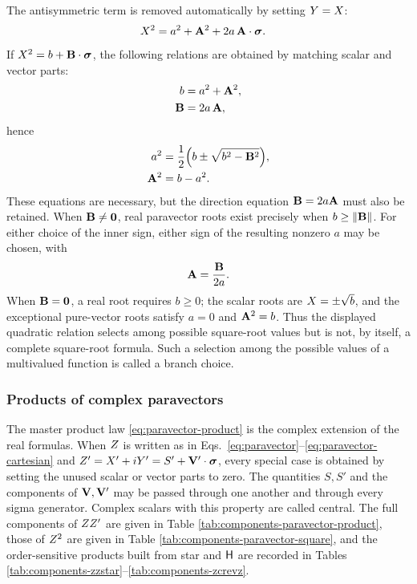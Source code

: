 The antisymmetric term is removed automatically by setting
\(Y=X\):
\begin{align*}
X^2
&= a^2+\mathbf{A}^2+2a\,\mathbf{A}\cdot\mathbf{\bm{\sigma}}.
\end{align*}
If \(X^2=b+\mathbf{B}\cdot\mathbf{\bm{\sigma}}\), the following relations are obtained by
matching scalar and vector parts:
\begin{align*}
b &= a^2+\mathbf{A}^2,\\
\mathbf{B} &= 2a\,\mathbf{A},
\end{align*}
hence
\begin{align*}
a^2 &= \frac{1}{2}\Bigl(b\pm\sqrt{b^2-\mathbf{B}^2}\Bigr),\\
\mathbf{A}^2 &= b-a^2.
\end{align*}
These equations are necessary, but the direction equation
\(\mathbf{B}=2a\mathbf{A}\) must also be retained. When
\(\mathbf{B}\neq\mathbf{0}\), real paravector roots exist precisely when
\(b\geq\lVert\mathbf{B}\rVert\). For either choice of the inner sign, either
sign of the resulting nonzero \(a\) may be chosen, with
\begin{equation*}
\mathbf{A}=\frac{\mathbf{B}}{2a}.
\end{equation*}
When \(\mathbf{B}=\mathbf{0}\), a real root requires \(b\geq0\); the scalar
roots are \(X=\pm\sqrt{b}\), and the exceptional pure-vector roots satisfy
\(a=0\) and \(\mathbf{A}^2=b\). Thus the displayed quadratic relation selects
among possible square-root values but is not, by itself, a complete
square-root formula. Such a selection among the possible values of a
multivalued function is called a branch choice.

\subsubsection{Products of complex paravectors}
The master product law \eqref{eq:paravector-product} is the complex
extension of the real formulas. When \(Z\) is written as in Eqs.\
\eqref{eq:paravector}--\eqref{eq:paravector-cartesian} and
\(Z'=X'+iY'=S'+\mathbf{V}'\cdot\mathbf{\bm{\sigma}}\), every special case is
obtained by setting the unused scalar or vector parts to zero. The
quantities \(S,S'\) and the components of \(\mathbf{V},\mathbf{V}'\) may be
passed through one another and through every sigma generator. Complex
scalars with this property are called central. The full components of
\(ZZ'\) are given in
Table \ref{tab:components-paravector-product}, those of \(Z^2\) are
given in Table \ref{tab:components-paravector-square}, and the
order-sensitive products built from star and \(\mathsf H\) are recorded in
Tables \ref{tab:components-zzstar}--\ref{tab:components-zcrevz}.

